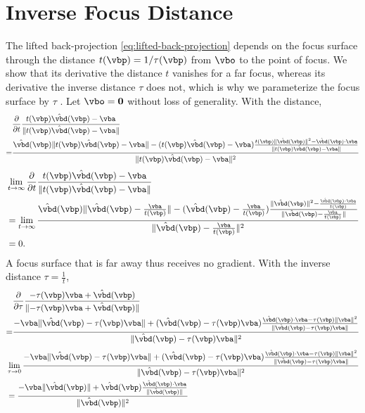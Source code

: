 \section{Inverse Focus Distance}
\label{sec:supp-inverse-depth}
The lifted back-projection \cref{eq:lifted-back-projection} depends
on the focus surface through the distance $t(\vbp)=1/\tau(\vbp)$
from $\vbo$ to the point of focus. We show that its derivative \wrt
the distance $t$ vanishes for a far focus, whereas its derivative
\wrt the inverse distance $\tau$ does not, which is why we
parameterize the focus surface by $\tau$
\cite{unified-inverse-depth,direct-sparse-odometry}. Let
$\vbo = \mathbf{0}$ without loss of generality. With the distance,
\begin{align*}
    &\frac{\partial}{\partial t} \frac{t(\vbp)\hat{\vbd}(\vbp)-\vba}{\lVert t(\vbp)\hat{\vbd}(\vbp)-\vba\rVert}\\
    = &\frac{\hat{\vbd}(\vbp)\lVert t(\vbp)\hat{\vbd}(\vbp)-\vba\rVert - (t(\vbp)\hat{\vbd}(\vbp)-\vba)\frac{t(\vbp)\lVert \hat{\vbd}(\vbp) \rVert^2 - \hat{\vbd}(\vbp)\cdot\vba}{\lVert t(\vbp)\hat{\vbd}(\vbp)-\vba\rVert}}{\lVert t(\vbp)\hat{\vbd}(\vbp)-\vba\rVert^2}
\end{align*}
\begin{align*}
    &\lim_{t\to \infty}\frac{\partial}{\partial t} \frac{t(\vbp)\hat{\vbd}(\vbp)-\vba}{\lVert t(\vbp)\hat{\vbd}(\vbp)-\vba\rVert}\\
    &= \lim_{t\to \infty}\frac{\hat{\vbd}(\vbp)\lVert \hat{\vbd}(\vbp)-\frac{\vba}{t(\vbp)}\rVert - (\hat{\vbd}(\vbp)-\frac{\vba}{t(\vbp)})\frac{\lVert \hat{\vbd}(\vbp) \rVert^2 - \frac{\hat{\vbd}(\vbp)\cdot\vba}{t(\vbp)}}{\lVert \hat{\vbd}(\vbp)-\frac{\vba}{t(\vbp)}\rVert}}{\lVert \hat{\vbd}(\vbp)-\frac{\vba}{t(\vbp)}\rVert^2}\\
    &= 0.
\end{align*}
A focus surface that is far away thus receives no gradient. With the
inverse distance $\tau=\frac{1}{t}$,
\begin{align*}
    &\frac{\partial}{\partial \tau}\frac{-\tau(\vbp)\vba + \hat{\vbd}(\vbp)}{\lVert-\tau(\vbp)\vba + \hat{\vbd}(\vbp)\rVert}\\
    = &\frac{-\vba\lVert \hat{\vbd}(\vbp)-\tau(\vbp)\vba\rVert + (\hat{\vbd}(\vbp)-\tau(\vbp)\vba)\frac{\hat{\vbd}(\vbp)\cdot\vba - \tau(\vbp)\lVert\vba\rVert^2}{\lVert \hat{\vbd}(\vbp)-\tau(\vbp)\vba\rVert}}{\lVert \hat{\vbd}(\vbp)-\tau(\vbp)\vba\rVert^2}
\end{align*}
\begin{align*}
    &\lim_{\tau\to 0}\frac{-\vba\lVert \hat{\vbd}(\vbp)-\tau(\vbp)\vba\rVert + (\hat{\vbd}(\vbp)-\tau(\vbp)\vba)\frac{\hat{\vbd}(\vbp)\cdot\vba - \tau(\vbp)\lVert\vba\rVert^2}{\lVert \hat{\vbd}(\vbp)-\tau(\vbp)\vba\rVert}}{\lVert \hat{\vbd}(\vbp)-\tau(\vbp)\vba\rVert^2}\\
    &= \frac{-\vba\lVert\hat{\vbd}(\vbp)\rVert + \hat{\vbd}(\vbp)\frac{\hat{\vbd}(\vbp)\cdot\vba}{\lVert \hat{\vbd}(\vbp)\rVert}}{\lVert\hat{\vbd}(\vbp)\rVert^2}
\end{align*}
